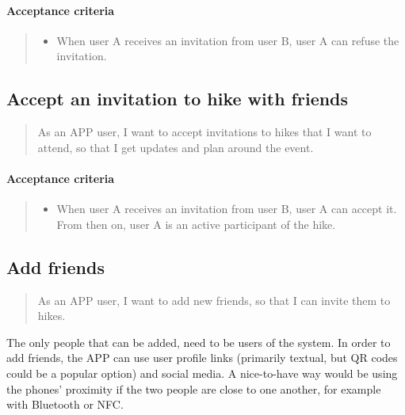 \paragraph*{Acceptance criteria}
\begin{quote}
\begin{itemize}
    \item When user A receives an invitation from user B, user A can refuse the invitation.
\end{itemize}
\end{quote}

\subsection{Accept an invitation to hike with friends}\label{US:friends-invite-accept}
\begin{quote}
As an APP user, I want to accept invitations to hikes that I want to attend, so that I get updates and plan around the event.
\end{quote}

\paragraph*{Acceptance criteria}
\begin{quote}
\begin{itemize}
    \item When user A receives an invitation from user B, user A can accept it. From then on, user A is an active participant of the hike.
\end{itemize}
\end{quote}


\subsection{Add friends}\label{US:friends-add}
\begin{quote}
As an APP user, I want to add new friends, so that I can invite them to hikes.
\end{quote}

The only people that can be added, need to be users of the system.
In order to add friends, the APP can use user profile links (primarily textual, but QR codes could be a popular option) and social media.
A nice-to-have way would be using the phones' proximity if the two people are close to one another, for example with Bluetooth or NFC.

